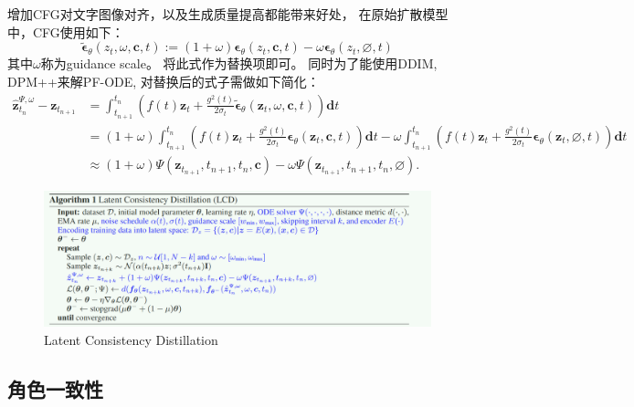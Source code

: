 \documentclass[lang=cn,newtx,10pt,scheme=chinese]{elegantbook}
\begin{document}
增加CFG对文字图像对齐，以及生成质量提高都能带来好处， 在原始扩散模型中，CFG使用如下：
\begin{equation}
\tilde{\boldsymbol{\epsilon}}_\theta\left(z_t, \omega, \boldsymbol{c}, t\right):=(1+\omega) \boldsymbol{\epsilon}_\theta\left(z_t, \boldsymbol{c}, t\right)-\omega \boldsymbol{\epsilon}_\theta\left(z_t, \varnothing, t\right)
\end{equation}
其中$\omega$称为guidance scale。
将此式作为替换项即可。
同时为了能使用DDIM, DPM++来解PF-ODE, 对替换后的式子需做如下简化：
\begin{equation}
\begin{aligned}
\hat{\boldsymbol{z}}_{t_n}^{\Psi, \omega}-\boldsymbol{z}_{t_{n+1}} & =\int_{t_{n+1}}^{t_n}\left(f(t) \boldsymbol{z}_t+\frac{g^2(t)}{2 \sigma_t} \tilde{\boldsymbol{\epsilon}}_\theta\left(\boldsymbol{z}_t, \omega, \boldsymbol{c}, t\right)\right) \mathbf{d} t \\
& =(1+\omega) \int_{t_{n+1}}^{t_n}\left(f(t) \boldsymbol{z}_t+\frac{g^2(t)}{2 \sigma_t} \boldsymbol{\epsilon}_\theta\left(\boldsymbol{z}_t, \boldsymbol{c}, t\right)\right) \mathbf{d} t-
\omega \int_{t_{n+1}}^{t_n}\left(f(t) \boldsymbol{z}_t+\frac{g^2(t)}{2 \sigma_t} \boldsymbol{\epsilon}_\theta\left(\boldsymbol{z}_t, \varnothing, t\right)\right) \mathbf{d} t \\
& \approx(1+\omega) \Psi\left(\boldsymbol{z}_{t_{n+1}}, t_{n+1}, t_n, \boldsymbol{c}\right)-\omega \Psi\left(\boldsymbol{z}_{t_{n+1}}, t_{n+1}, t_n, \varnothing\right) .
\end{aligned}
\end{equation}

\begin{figure}[h!]
\centering
\includegraphics[scale=0.7]{image/LCD.jpg}
\caption{Latent Consistency Distillation}
\label{fig:LCD}
\end{figure}

\subsection{角色一致性}
\end{document}
